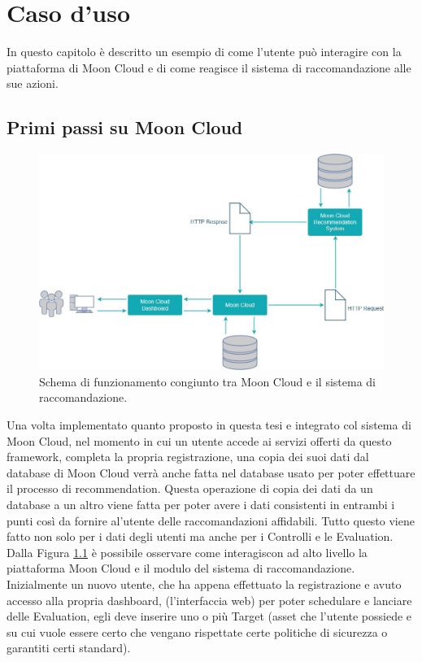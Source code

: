 \chapter{Caso d'uso}\label{chp:05-usecase}
In questo capitolo è descritto un esempio di come l'utente può interagire con la piattaforma di Moon Cloud e di come reagisce 
il sistema di raccomandazione alle sue azioni.
%
\section*{Primi passi su Moon Cloud}
\begin{figure}[ht!]
    \centering
    \includegraphics[scale=0.52]{images/UML_MoonCloud_HowToDo.jpg}
    \caption[Schema di funzionamento di questa soluzione]{Schema di funzionamento congiunto tra Moon Cloud e il sistema di raccomandazione.}
    \label{fig:UML_MoonCloud_HowToDo}
\end{figure}
\hfill\break
Una volta implementato quanto proposto in questa tesi e integrato col sistema di Moon Cloud, nel momento in cui un utente 
accede ai servizi offerti da questo framework, completa la propria registrazione, una copia dei suoi dati dal database di 
Moon Cloud verrà anche fatta nel database usato per poter effettuare il processo di recommendation. Questa operazione di 
copia dei dati da un database a un altro viene fatta per poter avere i dati consistenti in entrambi i punti così da 
fornire al'utente delle raccomandazioni affidabili. Tutto questo viene fatto non solo per i dati degli utenti ma anche 
per i Controlli e le Evaluation. Dalla Figura \ref{fig:UML_MoonCloud_HowToDo} è possibile osservare come interagiscon 
ad alto livello la piattaforma Moon Cloud e il modulo del sistema di raccomandazione.\hfill\break
Inizialmente un nuovo utente, che ha appena effettuato la registrazione e avuto accesso alla propria dashboard, (l'interfaccia 
web) per poter schedulare e lanciare delle Evaluation, egli deve inserire uno o più Target (asset che l'utente possiede e su 
cui vuole essere certo che vengano rispettate certe politiche di sicurezza o garantiti certi standard).
%
